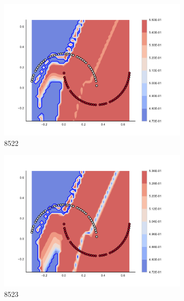 \begin{figure}[h]
\begin{subfigure}[b]{0.09\textwidth}
    \includegraphics[clip, trim=2.35cm 1.75cm 4.5cm 0cm,width=\textwidth]{img/convergence/8522.pdf}
    \caption{8522}
    \label{fig:convergence_8522}
\end{subfigure}
%
\begin{subfigure}[b]{0.09\textwidth}
    \includegraphics[clip, trim=2.35cm 1.75cm 4.5cm 0cm,width=\textwidth]{img/convergence/8523.pdf}
    \caption{8523}
    \label{fig:convergence_8523}
\end{subfigure}
%
\begin{subfigure}[b]{0.09\textwidth}

\end{subfigure}
\end{figure}
